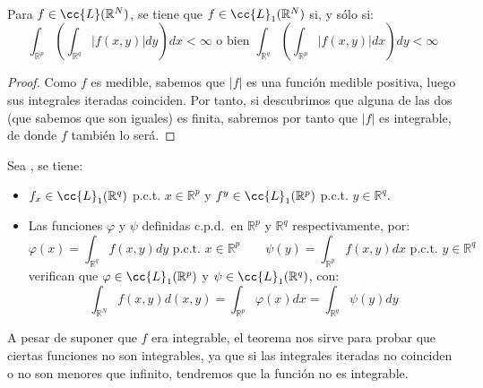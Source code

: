 \begin{teo}\ \\
    Para $f\in \cc{L}(\mathbb{R}^N)$, se tiene que $f\in \cc{L}_1(\mathbb{R}^N)$ si, y sólo si:
    \begin{equation*}
        \int_{\mathbb{R}^p} \left(\int_{\mathbb{R}^q} |f(x,y)|dy \right)dx<\infty \text{\ o\ bien\ } \int_{\mathbb{R}^q} \left(\int_{\mathbb{R}^p} |f(x,y)|dx\right)dy < \infty
    \end{equation*}
    \begin{proof}
        Como $f$ es medible, sabemos que $|f|$ es una función medible positiva, luego sus integrales iteradas coinciden. Por tanto, si descubrimos que alguna de las dos (que sabemos que son iguales) es finita, sabremos por tanto que $|f|$ es integrable, de donde $f$ también lo será.
    \end{proof}
\end{teo}

\begin{teo}
    Sea , se tiene:
    \begin{itemize}
        \item $f_x\in \cc{L}_1(\mathbb{R}^q)$ p.c.t. $x\in \mathbb{R}^p$ y $f^y \in \cc{L}_1(\mathbb{R}^p)$ p.c.t. $y\in \mathbb{R}^q$.
        \item Las funciones $\varphi$ y $\psi$ definidas c.p.d.\ en $\mathbb{R}^p$ y $\mathbb{R}^q$ respectivamente, por:
            \begin{equation*}
                \varphi(x)=\int_{\mathbb{R}^q} f(x,y)dy \text{\ p.c.t.\ }x\in \mathbb{R}^p \qquad \psi(y) = \int_{\mathbb{R}^p} f(x,y)dx \text{\ p.c.t.\ } y \in \mathbb{R}^q
            \end{equation*}
            verifican que $\varphi \in \cc{L}_1(\mathbb{R}^p)$ y $\psi \in \cc{L}_1(\mathbb{R}^q)$, con:
            \begin{equation*}
                \int_{\mathbb{R}^N}f(x,y)d(x,y) = \int_{\mathbb{R}^p}\varphi(x)dx = \int_{\mathbb{R}^q}\psi(y)dy
            \end{equation*}
    \end{itemize}
\end{teo}

A pesar de suponer que $f$ era integrable, el teorema nos sirve para probar que ciertas funciones no son integrables, ya que si las integrales iteradas no coinciden o no son menores que infinito, tendremos que la función no es integrable.\\

